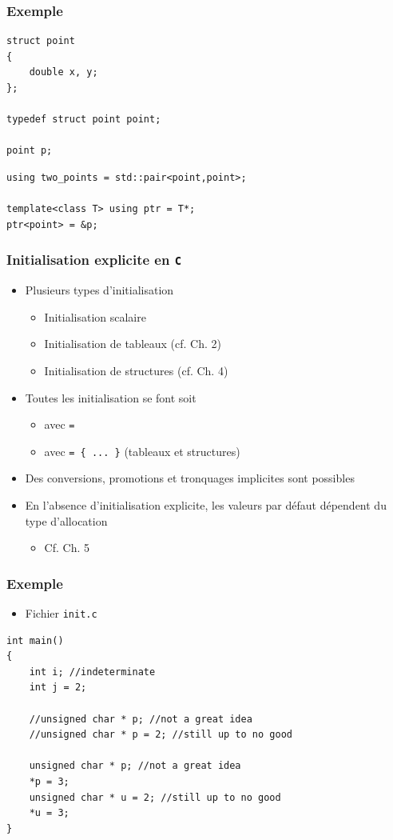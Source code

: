 \begin{frame}[containsverbatim]
\frametitle{Exemple}
\begin{lstlisting}
struct point 
{
	double x, y;
};

typedef struct point point;

point p;
\end{lstlisting}
\begin{lstlisting}
using two_points = std::pair<point,point>;

template<class T> using ptr = T*;
ptr<point> = &p;
\end{lstlisting}
\end{frame}

\begin{frame}
\frametitle{Initialisation explicite en \texttt{C}}
\begin{itemize}[<+->]
\item Plusieurs types d'initialisation
	\begin{itemize}
	\item Initialisation scalaire
	\item Initialisation de tableaux (cf. Ch. 2)
	\item Initialisation de structures (cf. Ch. 4)
	\end{itemize}
\item Toutes les initialisation se font soit
	\begin{itemize}
	\item avec \texttt{=}
	\item avec \texttt{= \{ ... \}} (tableaux et structures)
	\end{itemize}
\item Des conversions, promotions et tronquages implicites sont possibles
\item En l'absence d'initialisation explicite, les valeurs par défaut dépendent du type d'allocation
	\begin{itemize}
	\item Cf. Ch. 5
	\end{itemize}
\end{itemize}
\end{frame}
%
\begin{frame}[containsverbatim]
\frametitle{Exemple}
\begin{itemize}
\item Fichier \texttt{init.c}
\end{itemize}
\begin{lstlisting}
int main()
{
    int i; //indeterminate
    int j = 2; 
	
    //unsigned char * p; //not a great idea
    //unsigned char * p = 2; //still up to no good

    unsigned char * p; //not a great idea
    *p = 3; 
    unsigned char * u = 2; //still up to no good
    *u = 3;
}
\end{lstlisting}
\end{frame}

